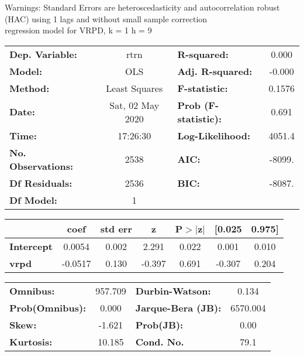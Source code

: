 Warnings: \newline
 [1] Standard Errors are heteroscedasticity and autocorrelation robust (HAC) using 1 lags and without small sample correction\\ 

regression model for VRPD, k = 1 h = 9\begin{center}
\begin{tabular}{lclc}
\toprule
\textbf{Dep. Variable:}    &       rtrn       & \textbf{  R-squared:         } &     0.000   \\
\textbf{Model:}            &       OLS        & \textbf{  Adj. R-squared:    } &    -0.000   \\
\textbf{Method:}           &  Least Squares   & \textbf{  F-statistic:       } &    0.1576   \\
\textbf{Date:}             & Sat, 02 May 2020 & \textbf{  Prob (F-statistic):} &    0.691    \\
\textbf{Time:}             &     17:26:30     & \textbf{  Log-Likelihood:    } &    4051.4   \\
\textbf{No. Observations:} &        2538      & \textbf{  AIC:               } &    -8099.   \\
\textbf{Df Residuals:}     &        2536      & \textbf{  BIC:               } &    -8087.   \\
\textbf{Df Model:}         &           1      & \textbf{                     } &             \\
\bottomrule
\end{tabular}
\begin{tabular}{lcccccc}
                   & \textbf{coef} & \textbf{std err} & \textbf{z} & \textbf{P$> |$z$|$} & \textbf{[0.025} & \textbf{0.975]}  \\
\midrule
\textbf{Intercept} &       0.0054  &        0.002     &     2.291  &         0.022        &        0.001    &        0.010     \\
\textbf{vrpd}      &      -0.0517  &        0.130     &    -0.397  &         0.691        &       -0.307    &        0.204     \\
\bottomrule
\end{tabular}
\begin{tabular}{lclc}
\textbf{Omnibus:}       & 957.709 & \textbf{  Durbin-Watson:     } &    0.134  \\
\textbf{Prob(Omnibus):} &   0.000 & \textbf{  Jarque-Bera (JB):  } & 6570.004  \\
\textbf{Skew:}          &  -1.621 & \textbf{  Prob(JB):          } &     0.00  \\
\textbf{Kurtosis:}      &  10.185 & \textbf{  Cond. No.          } &     79.1  \\
\bottomrule
\end{tabular}
\end{center}

